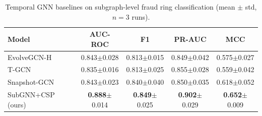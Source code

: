 \begin{table}[t]
\centering
\caption{Temporal GNN baselines on subgraph-level fraud ring classification (mean $\pm$ std, $n=3$ runs).}
\label{tab:temporal_baselines}
\begin{tabular}{lcccc}
\toprule
\textbf{Model} & \textbf{AUC-ROC} & \textbf{F1} & \textbf{PR-AUC} & \textbf{MCC} \\
\midrule
EvolveGCN-H               & 0.843$\pm$0.028 & 0.813$\pm$0.015 & 0.849$\pm$0.042 & 0.575$\pm$0.027 \\
T-GCN                     & 0.835$\pm$0.016 & 0.813$\pm$0.025 & 0.855$\pm$0.028 & 0.559$\pm$0.042 \\
Snapshot-GCN              & 0.843$\pm$0.023 & 0.840$\pm$0.040 & 0.850$\pm$0.035 & 0.618$\pm$0.052 \\
SubGNN+CSP (ours)         & \textbf{0.888}$\pm$0.014 & \textbf{0.849}$\pm$0.025 & \textbf{0.902}$\pm$0.029 & \textbf{0.652}$\pm$0.009 \\
\bottomrule
\end{tabular}
\end{table}

\begin{table}[t]
\centering
\caption{Augmentation strategy ablation for CSP regularizer (mean $\pm$ std, $n=3$ runs). Best in \textbf{bold}.}
\label{tab:augmentation}
\end{table}

